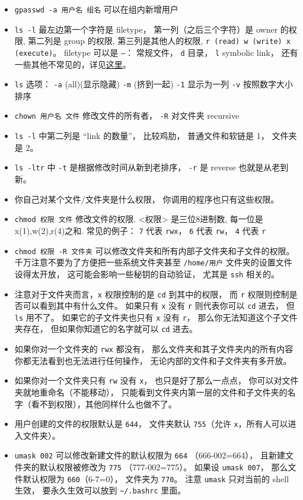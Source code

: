 \begin{itemize}
\item \verb`gpasswd -a 用户名 组名` 可以在组内新增用户
\item \verb`ls -l` 最左边第一个字符是 filetype， 第一列（之后三个字符）是 owner 的权限, 第二列是 group 的权限, 第三列是其他人的权限, \verb`r (read) w (write) x (execute)`。 filetype 可以是 \verb|–|： 常规文件， \verb|d| 目录， \verb|l| symbolic link， 还有一些其他不常见的，详见\href{https://linuxconfig.org/identifying-file-types-in-linux}{这里}。
\item \verb`ls` 选项： \verb`-a` (all)(显示隐藏) \verb`-m` (挤到一起) \verb`-1` 显示为一列 \verb`-v` 按照数字大小排序
\item \verb`chown 用户名 文件` 修改文件的所有者， \verb|-R| 对文件夹 recursive
\item \verb|ls -l| 中第二列是 “link 的数量”， 比较鸡肋， 普通文件和软链是 1， 文件夹是 2。
\item \verb`ls -ltr` 中 \verb`-t` 是根据修改时间从新到老排序， \verb`-r` 是 reverse 也就是从老到新。
\item 你自己对某个文件/文件夹是什么权限， 你调用的程序也只有这些权限。
\item \verb`chmod 权限 文件` 修改文件的权限. <权限> 是三位8进制数, 每一位是 x(1),w(2),r(4)之和. 常见的例子： \verb|7| 代表 \verb|rwx|， \verb|6| 代表 \verb|rw|， \verb|4| 代表 \verb|r|
\item \verb`chmod 权限 -R 文件夹` 可以修改文件夹和所有内部子文件夹和子文件的权限。 千万注意不要为了方便把一些系统文件夹甚至 \verb|/home/用户| 文件夹的设置文件设得太开放， 这可能会影响一些秘钥的自动验证， 尤其是 \verb|ssh| 相关的。
\item 注意对于文件夹而言，\verb|x| 权限控制的是 \verb|cd| 到其中的权限， 而 \verb|r| 权限则控制是否可以看到其中有什么文件。 如果只有 \verb|x| 没有 \verb|r| 则代表你可以 \verb|cd| 进去， 但 \verb|ls| 用不了。 如果它的子文件夹也只有 \verb|x| 没有 \verb|r|， 那么你无法知道这个子文件夹存在， 但如果你知道它的名字就可以 \verb|cd| 进去。
\item 如果你对一个文件夹的 \verb|rwx| 都没有， 那么文件夹和其子文件夹内的所有内容你都无法看到也无法进行任何操作， 无论内部的文件和子文件夹有多开放。
\item 如果你对一个文件夹只有 \verb|rw| 没有 \verb|x|， 也只是好了那么一点点， 你可以对文件夹就地重命名（不能移动）， 只能看到文件夹内第一层的文件和子文件夹的名字（看不到权限），其他同样什么也做不了。
\item 用户创建的文件的权限默认是 \verb|644|， 文件夹默认 \verb|755|（允许 \verb|x|，所有人可以进入文件夹）。
\item \verb|umask 002| 可以修改新建文件的默认权限为 \verb|664| （666-002=664）， 且新建文件夹的默认权限被修改为 \verb|775| （777-002=775）。 如果设 \verb|umask 007|， 那么文件默认权限为 \verb|660|（6-7=0）， 文件夹为 \verb|770|。 注意 \verb|umask| 只对当前的 shell 生效， 要永久生效可以放到 \verb|~/.bashrc| 里面。

\end{itemize}
